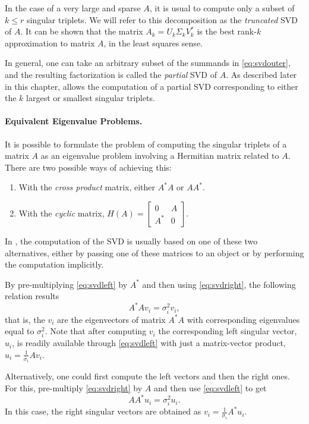 In the case of a very large and sparse $A$, it is usual to compute only a subset of $k\leq r$ singular triplets. We will refer to this decomposition as the \emph{truncated} SVD of $A$. It can be shown that the matrix $A_k=U_k\Sigma_k V_k^*$ is the best rank-$k$ approximation to matrix $A$, in the least squares sense.

In general, one can take an arbitrary subset of the summands in \eqref{eq:svdouter}, and the resulting factorization is called the \emph{partial} SVD of $A$. As described later in this chapter, \slepc allows the computation of a partial SVD corresponding to either the $k$ largest or smallest singular triplets.

\paragraph{Equivalent Eigenvalue Problems.}

It is possible to formulate the problem of computing the singular triplets of a matrix $A$ as an eigenvalue problem involving a Hermitian matrix related to $A$. There are two possible ways of achieving this:
\begin{enumerate}
\item With the \emph{cross product} matrix, either $A^*A$ or $AA^*$.
\item With the \emph{cyclic} matrix, $H(A)=\left[\begin{smallmatrix}0&A\\A^*&0\end{smallmatrix}\right]$.
\end{enumerate}
In \slepc, the computation of the SVD is usually based on one of these two alternatives, either by passing one of these matrices to an  object or by performing the computation implicitly.

By pre-multiplying \eqref{eq:svdleft} by $A^*$ and then using \eqref{eq:svdright}, the following relation results
\begin{equation}
\label{eq:eigleft}
A^*Av_i=\sigma_i^2v_i,
\end{equation}
that is, the $v_i$ are the eigenvectors of matrix $A^*A$ with corresponding eigenvalues equal to $\sigma_i^2$. Note that after computing $v_i$ the corresponding left singular vector, $u_i$, is readily available through \eqref{eq:svdleft} with just a matrix-vector product, $u_i=\frac{1}{\sigma_i}Av_i$.

Alternatively, one could first compute the left vectors and then the right ones. For this, pre-multiply \eqref{eq:svdright} by $A$ and then use \eqref{eq:svdleft} to get
\begin{equation}
\label{eq:eigright}
AA^*u_i=\sigma_i^2u_i.
\end{equation}
In this case, the right singular vectors are obtained as $v_i=\frac{1}{\sigma_i}A^*u_i$.

